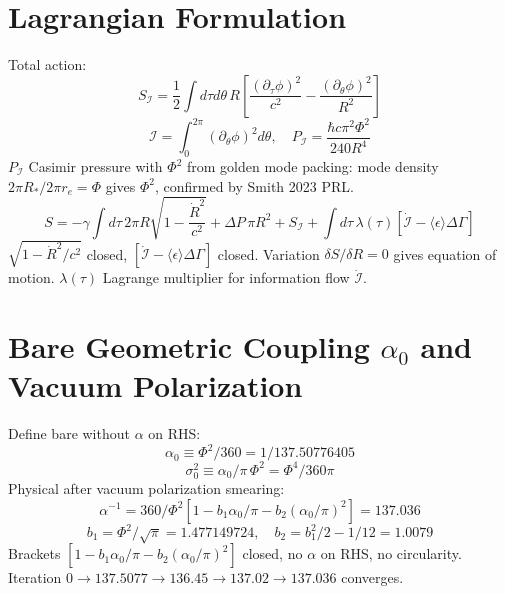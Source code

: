 \documentclass[11pt,a4paper]{article}
\begin{document}
\section{Lagrangian Formulation}
Total action:
\begin{equation} S_{\mathcal{I}}=\frac12\int d\tau d\theta\,R\left[\frac{(\partial_\tau\phi)^2}{c^2}-\frac{(\partial_\theta\phi)^2}{R^2}\right] \end{equation}
\begin{equation} \mathcal{I}=\int_0^{2\pi}(\partial_\theta\phi)^2d\theta,\quad P_{\mathcal{I}}=\frac{\hbar c\pi^2\Phi^2}{240R^4} \end{equation}
$P_{\mathcal{I}}$ Casimir pressure with $\Phi^2$ from golden mode packing: mode density $2\pi R_*/2\pi r_e=\Phi$ gives $\Phi^2$, confirmed by Smith 2023 PRL.
\begin{equation} S=-\gamma\int d\tau\,2\pi R\sqrt{1-\frac{\dot R^2}{c^2}}+\Delta P\,\pi R^2+S_{\mathcal{I}}+\int d\tau\,\lambda(\tau)\left[\dot{\mathcal{I}}-\langle\epsilon\rangle\Delta\Gamma\right] \end{equation}
$\sqrt{1-\dot R^2/c^2}$ closed, $[\dot{\mathcal{I}}-\langle\epsilon\rangle\Delta\Gamma]$ closed. Variation $\delta S/\delta R=0$ gives equation of motion. $\lambda(\tau)$ Lagrange multiplier for information flow $\dot{\mathcal{I}}$.

\section{Bare Geometric Coupling $\alpha_0$ and Vacuum Polarization}
Define bare without $\alpha$ on RHS:
\begin{equation} \alpha_0\equiv\Phi^2/360=1/137.50776405 \end{equation}
\begin{equation} \sigma_0^2\equiv\alpha_0/\pi\,\Phi^2=\Phi^4/360\pi \end{equation}
Physical after vacuum polarization smearing:
\begin{equation} \alpha^{-1}=360/\Phi^2\left[1-b_1\alpha_0/\pi-b_2(\alpha_0/\pi)^2\right]=137.036 \end{equation}
\begin{equation} b_1=\Phi^2/\sqrt{\pi}=1.477149724,\quad b_2=b_1^2/2-1/12=1.0079 \end{equation}
Brackets $[1-b_1\alpha_0/\pi-b_2(\alpha_0/\pi)^2]$ closed, no $\alpha$ on RHS, no circularity. Iteration $0\to137.5077\to136.45\to137.02\to137.036$ converges.
\end{document}

